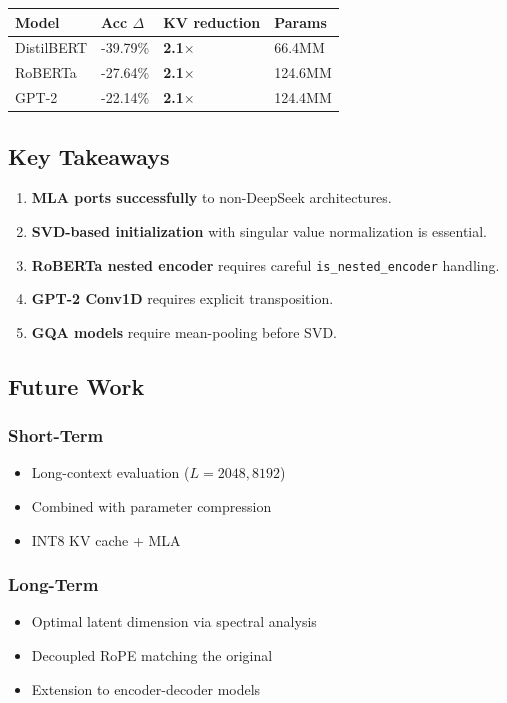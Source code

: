 \begin{table}[H]
\centering
\small
\begin{tabular}{llll}
\toprule
\textbf{Model} & \textbf{Acc $\Delta$} & \textbf{KV reduction} & \textbf{Params} \\
\midrule
DistilBERT & -39.79\% & \textbf{2.1$\times$} & 66.4MM \\
RoBERTa & -27.64\% & \textbf{2.1$\times$} & 124.6MM \\
GPT-2 & -22.14\% & \textbf{2.1$\times$} & 124.4MM \\
\bottomrule
\end{tabular}
\end{table}

\subsection{Key Takeaways}

\begin{enumerate}
\item \textbf{MLA ports successfully} to non-DeepSeek architectures.
\item \textbf{SVD-based initialization} with singular value normalization is
  essential.
\item \textbf{RoBERTa nested encoder} requires careful \texttt{is\_nested\_encoder} handling.
\item \textbf{GPT-2 Conv1D} requires explicit transposition.
\item \textbf{GQA models} require mean-pooling before SVD.

\end{enumerate}
\subsection{Future Work}

\subsubsection{Short-Term}
\begin{itemize}
\item Long-context evaluation ($L = 2048, 8192$)
\item Combined with parameter compression
\item INT8 KV cache + MLA

\end{itemize}
\subsubsection{Long-Term}
\begin{itemize}
\item Optimal latent dimension via spectral analysis
\item Decoupled RoPE matching the original
\item Extension to encoder-decoder models

\end{itemize}
